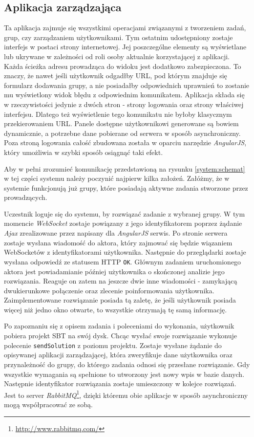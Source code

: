 \documentclass[brudnopis]{xmgr}
\begin{document}
\subsection{Aplikacja zarządzająca}

Ta aplikacja zajmuje się wszystkimi operacjami związanymi z tworzeniem zadań, grup, czy zarządzaniem użytkownikami. Tym ostatnim udostępniony zostaje interfejs w postaci strony internetowej. Jej poszczególne elementy są wyświetlane lub ukrywane w zależności od roli osoby aktualnie korzystającej z aplikacji. Każda ścieżka adresu prowadząca do widoku jest dodatkowo zabezpieczona. To znaczy, że nawet jeśli użytkownik odgadłby URL, pod którym znajduje się formularz dodawania grupy, a nie posiadałby odpowiednich uprawnień to zostanie mu wyświetlony widok błędu z odpowiednim komunikatem. 
Aplikacja składa się w rzeczywistości jedynie z dwóch stron - strony logowania oraz strony właściwej interfejsu. Dlatego też wyświetlenie tego komunikatu nie byłoby klasycznym przekierowaniem URL.
Panele dostępne użytkownikowi generowane są bowiem dynamicznie, a potrzebne dane pobierane od serwera w sposób asynchroniczny. Poza stroną logowania całość zbudowana została w oparciu narzędzie \emph{AngularJS}, który umożliwia w szybki sposób osiągnąć taki efekt.

Aby w pełni zrozumieć komunikację przedstawioną na rysunku \ref{system:schemat} w tej części systemu należy poczynić najpierw kilka założeń. Załóżmy, że w systemie funkcjonują już grupy, które posiadają aktywne zadania stworzone przez prowadzących. 

Uczestnik loguje się do systemu, by rozwiązać zadanie z wybranej grupy. W tym momencie \emph{WebSocket} zostaje powiązany z jego identyfikatorem poprzez żądanie \emph{Ajax} zrealizowane przez napisany dla \emph{AngularJS} serwis. Po stronie serwera zostaje wysłana wiadomość do aktora, który zajmować się będzie wiązaniem WebSocketów z identyfikatorami użytkownika. Następnie do przeglądarki zostaje wysłana odpowiedź ze statusem HTTP \texttt{OK}. Głównym zadaniem uruchomionego aktora jest powiadamianie później użytkownika o skończonej analizie jego rozwiązania. Reaguje on zatem na jeszcze dwie inne wiadomości - zamykającą dwukierunkowe połączenie oraz zlecenie poinformowania użytkownika. Zaimplementowane rozwiązanie posiada tą zaletę, że jeśli użytkownik posiada więcej niż jedno okno otwarte, to wszystkie otrzymają tę samą informację. 

Po zapoznaniu się z opisem zadania i poleceniami do wykonania, użytkownik pobiera projekt SBT na swój dysk. Chcąc wysłać swoje rozwiązanie wykonuje polecenie \texttt{sendSolution} z poziomu projektu. Zostaje wysłane żądanie do opisywanej aplikacji zarządzającej, która zweryfikuje dane użytkownika oraz przynależność do grupy, do którego zadania odnosi się przesłane rozwiązanie. Gdy wszystkie wymagania są spełnione to utworzony jest nowy wpis w bazie danych. Następnie identyfikator rozwiązania zostaje umieszczony w kolejce rozwiązań. Jest to server \emph{RabbitMQ}\footnote{\url{http://www.rabbitmq.com/}}, dzięki któremu obie aplikacje w sposób asynchroniczny mogą współpracować ze sobą.
  
\end{document}
